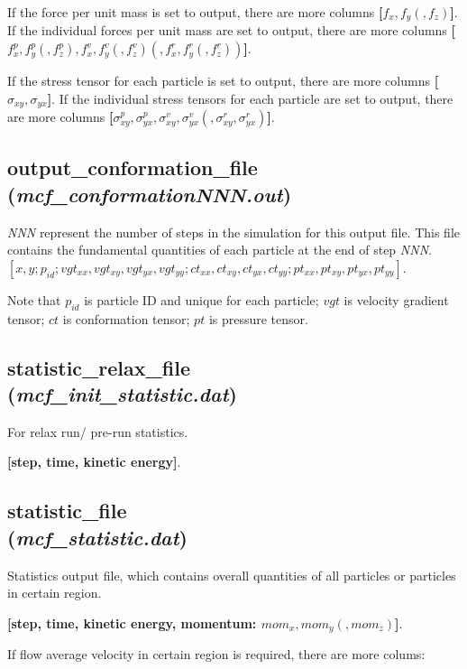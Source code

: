 \documentclass[a4paper,10pt]{article}
\begin{document}
If the force per unit mass is set to output,
there are more columns
\textbf{[$f_x, f_y(, f_z)$]}.
If the individual forces per unit mass are set to output,
there are more columns
\textbf{[$f^p_x, f^p_y(, f^p_z),f^v_x, f^v_y(, f^v_z)(,f^r_x, f^r_y(, f^r_z))$]}.


If the stress tensor for each particle is set to output,
there are more columns
\textbf{[$\sigma_{xy}, \sigma_{yx}$]}.
If the individual stress tensors for each particle are set to output,
there are more columns
\textbf{[$\sigma^p_{xy}, \sigma^p_{yx}, \sigma^v_{xy}, \sigma^v_{yx}(,\sigma^r_{xy}, \sigma^r_{yx})$]}.


\subsection{\textbf{output\_conformation\_file}\\
(\textit{mcf\_conformationNNN.out})}
\textit{NNN} represent the number of steps in the simulation for this output file.
This file contains the fundamental quantities of each particle
at the end of step \textit{NNN}.
\textbf{$[x, y; p_{id}; 
vgt_{xx}, vgt_{xy}, vgt_{yx}, vgt_{yy}; 
ct_{xx}, ct_{xy}, ct_{yx}, ct_{yy}; 
pt_{xx}, pt_{xy}, pt_{yx}, pt_{yy}]$}.

Note that 
\textbf{$p_{id}$} is particle ID and
unique for each particle;
\textbf{$vgt$} is velocity gradient tensor;
\textbf{$ct$} is conformation tensor;
\textbf{$pt$} is pressure tensor.


\subsection{\textbf{statistic\_relax\_file}\\
(\textit{mcf\_init\_statistic.dat})}
For relax run/ pre-run statistics.

\textbf{[step, time, kinetic energy]}.

\subsection{\textbf{statistic\_file}\\
(\textit{mcf\_statistic.dat})}
Statistics output file,
which contains overall quantities of all particles
or particles in certain region.

\textbf{[step, time, kinetic energy, momentum: $mom_x, mom_y(, mom_z)$]}.

If flow average velocity in certain region is required, 
there are more colums:
\end{document}
